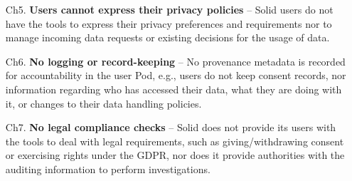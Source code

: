 \begin{enumerate}
    \item [Ch5.] \textbf{Users cannot express their privacy policies} -- Solid users do not have the tools to express their privacy preferences and requirements nor to manage incoming data requests or existing decisions for the usage of data.
    \item [Ch6.] \textbf{No logging or record-keeping} -- No provenance metadata is recorded for accountability in the user Pod, e.g., users do not keep consent records, nor information regarding who has accessed their data, what they are doing with it, or changes to their data handling policies.
    \item [Ch7.] \textbf{No legal compliance checks} -- Solid does not provide its users with the tools to deal with legal requirements, such as giving/withdrawing consent or exercising rights under the GDPR, nor does it provide authorities with the auditing information to perform investigations.
\end{enumerate}